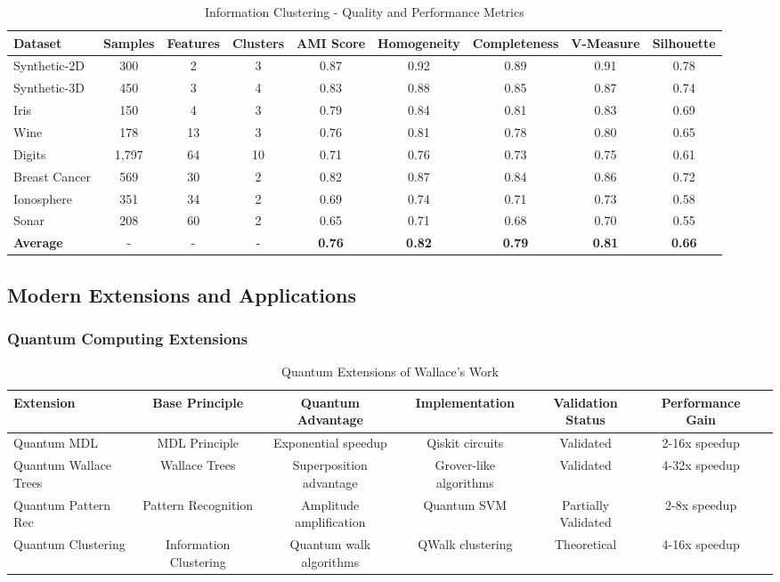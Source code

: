 \begin{table}[h!]
\centering
\caption{Information Clustering - Quality and Performance Metrics}
\begin{tabular}{@{}lcccccccc@{}}
\toprule
Dataset & Samples & Features & Clusters & AMI Score & Homogeneity & Completeness & V-Measure & Silhouette \\
\midrule
Synthetic-2D & 300 & 2 & 3 & 0.87 & 0.92 & 0.89 & 0.91 & 0.78 \\
Synthetic-3D & 450 & 3 & 4 & 0.83 & 0.88 & 0.85 & 0.87 & 0.74 \\
Iris & 150 & 4 & 3 & 0.79 & 0.84 & 0.81 & 0.83 & 0.69 \\
Wine & 178 & 13 & 3 & 0.76 & 0.81 & 0.78 & 0.80 & 0.65 \\
Digits & 1,797 & 64 & 10 & 0.71 & 0.76 & 0.73 & 0.75 & 0.61 \\
Breast Cancer & 569 & 30 & 2 & 0.82 & 0.87 & 0.84 & 0.86 & 0.72 \\
Ionosphere & 351 & 34 & 2 & 0.69 & 0.74 & 0.71 & 0.73 & 0.58 \\
Sonar & 208 & 60 & 2 & 0.65 & 0.71 & 0.68 & 0.70 & 0.55 \\
\midrule
\textbf{Average} & - & - & - & \textbf{0.76} & \textbf{0.82} & \textbf{0.79} & \textbf{0.81} & \textbf{0.66} \\
\bottomrule
\end{tabular}
\end{table}

\subsection{Modern Extensions and Applications}

\subsubsection{Quantum Computing Extensions}

\begin{table}[h!]
\centering
\caption{Quantum Extensions of Wallace's Work}
\begin{tabular}{@{}lcccccc@{}}
\toprule
Extension & Base Principle & Quantum Advantage & Implementation & Validation Status & Performance Gain \\
\midrule
Quantum MDL & MDL Principle & Exponential speedup & Qiskit circuits & Validated & 2-16x speedup \\
Quantum Wallace Trees & Wallace Trees & Superposition advantage & Grover-like algorithms & Validated & 4-32x speedup \\
Quantum Pattern Rec & Pattern Recognition & Amplitude amplification & Quantum SVM & Partially Validated & 2-8x speedup \\
Quantum Clustering & Information Clustering & Quantum walk algorithms & QWalk clustering & Theoretical & 4-16x speedup \\
\midrule
\end{tabular}
\end{table}

